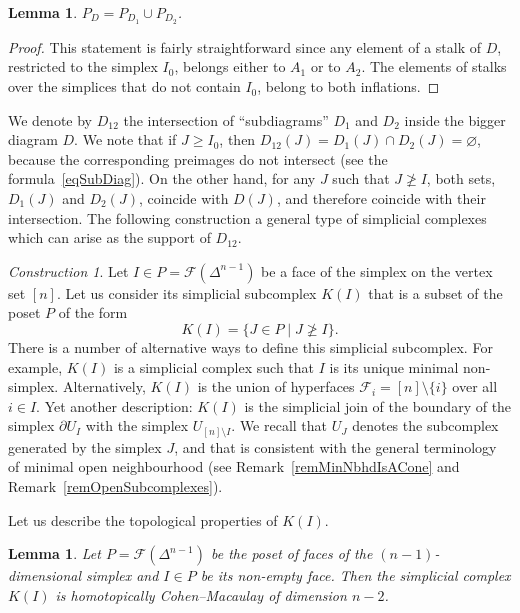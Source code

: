 \documentclass[english,12pt,oneside]{amsproc}
\newcommand{\ca}[1]{\mathcal{#1}}
\newcommand{\dd}{\partial}
\newcounter{stmcounter}[section]
\numberwithin{equation}{section}
\theoremstyle{plain}
\newtheorem{lem}[stmcounter]{Lemma}
\theoremstyle{definition}
\theoremstyle{remark}
\newtheorem{con}[stmcounter]{Construction}
\begin{document}
\begin{lem}\label{lemUnion}
$P_D=P_{D_1}\cup P_{D_2}$.
\end{lem}

\begin{proof}
This statement is fairly straightforward since any element of a stalk of $D$, restricted to the simplex $I_0$, belongs either to $A_1$ or to $A_2$. The elements of stalks over the simplices that do not contain $I_0$, belong to both inflations.
\end{proof}

We denote by $D_{12}$ the intersection of ``subdiagrams'' $D_1$ and $D_2$ inside the bigger diagram $D$. We note that if $J\geqslant I_0$, then $D_{12}(J)=D_1(J)\cap D_2(J)=\varnothing$, because the corresponding preimages do not intersect (see the formula~\eqref{eqSubDiag}). On the other hand, for any $J$ such that $J\ngeqslant I$, both sets, $D_1(J)$ and $D_2(J)$, coincide with $D(J)$, and therefore coincide with their intersection. The following construction a general type of simplicial complexes which can arise as the support of $D_{12}$.

\begin{con}\label{conMainSubcomplex}
Let $I\in P=\ca{F}(\Delta^{n-1})$ be a face of the simplex on the vertex set $[n]$. Let us consider its simplicial subcomplex $K(I)$ that is a subset of the poset $P$ of the form
\[
K(I)=\{J\in P\mid J\ngeqslant I\}.
\]
There is a number of alternative ways to define this simplicial subcomplex. For example, $K(I)$ is a simplicial complex such that $I$ is its unique minimal non-simplex. Alternatively, $K(I)$ is the union of hyperfaces $\ca{F}_i=[n]\setminus \{i\}$ over all $i\in I$. Yet another description: $K(I)$ is the simplicial join of the boundary of the simplex $\dd U_I$ with the simplex $U_{[n]\setminus I}$. We recall that $U_J$ denotes the subcomplex generated by the simplex $J$, and that is consistent with the general terminology of minimal open neighbourhood (see Remark~\ref{remMinNbhdIsACone} and Remark~\ref{remOpenSubcomplexes}).
\end{con}


Let us describe the topological properties of $K(I)$.

\begin{lem}\label{lemCMofMain}
Let $P=\ca{F}(\Delta^{n-1})$ be the poset of faces of the $(n-1)$-dimensional simplex and $I\in P$ be its non-empty face. Then the simplicial complex $K(I)$ is homotopically Cohen–Macaulay of dimension $n-2$.
\end{lem}
\end{document}
